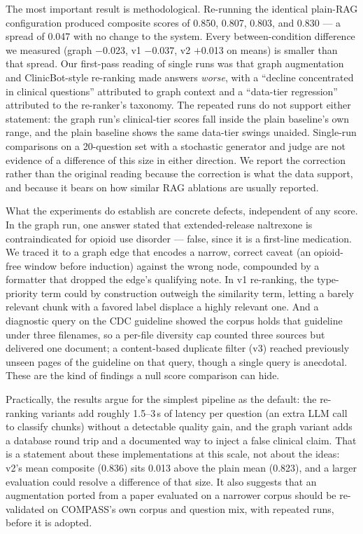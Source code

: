 \documentclass[11pt]{article}
\begin{document}
The most important result is methodological. Re-running the identical plain-RAG configuration produced composite scores of 0.850, 0.807, 0.803, and 0.830 --- a spread of 0.047 with no change to the system. Every between-condition difference we measured (graph $-$0.023, v1 $-$0.037, v2 $+$0.013 on means) is smaller than that spread. Our first-pass reading of single runs was that graph augmentation and ClinicBot-style re-ranking made answers \emph{worse}, with a ``decline concentrated in clinical questions'' attributed to graph context and a ``data-tier regression'' attributed to the re-ranker's taxonomy. The repeated runs do not support either statement: the graph run's clinical-tier scores fall inside the plain baseline's own range, and the plain baseline shows the same data-tier swings unaided. Single-run comparisons on a 20-question set with a stochastic generator and judge are not evidence of a difference of this size in either direction. We report the correction rather than the original reading because the correction is what the data support, and because it bears on how similar RAG ablations are usually reported.

What the experiments do establish are concrete defects, independent of any score. In the graph run, one answer stated that extended-release naltrexone is contraindicated for opioid use disorder --- false, since it is a first-line medication. We traced it to a graph edge that encodes a narrow, correct caveat (an opioid-free window before induction) against the wrong node, compounded by a formatter that dropped the edge's qualifying note. In v1 re-ranking, the type-priority term could by construction outweigh the similarity term, letting a barely relevant chunk with a favored label displace a highly relevant one. And a diagnostic query on the CDC guideline showed the corpus holds that guideline under three filenames, so a per-file diversity cap counted three sources but delivered one document; a content-based duplicate filter (v3) reached previously unseen pages of the guideline on that query, though a single query is anecdotal. These are the kind of findings a null score comparison can hide.

Practically, the results argue for the simplest pipeline as the default: the re-ranking variants add roughly 1.5--3\,s of latency per question (an extra LLM call to classify chunks) without a detectable quality gain, and the graph variant adds a database round trip and a documented way to inject a false clinical claim. That is a statement about these implementations at this scale, not about the ideas: v2's mean composite (0.836) sits 0.013 above the plain mean (0.823), and a larger evaluation could resolve a difference of that size. It also suggests that an augmentation ported from a paper evaluated on a narrower corpus should be re-validated on COMPASS's own corpus and question mix, with repeated runs, before it is adopted.
\end{document}
